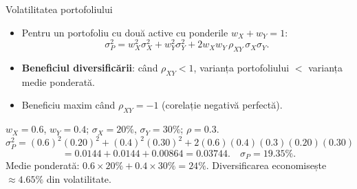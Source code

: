 \documentclass[9pt, aspectratio=169, t]{beamer}
\theoremstyle{definition}
\begin{document}
\begin{frame}{Volatilitatea portofoliului}
\begin{itemize}
    \item Pentru un portofoliu cu două active cu ponderile $w_X + w_Y = 1$:
    \[
    \sigma_P^2 = w_X^2\sigma_X^2 + w_Y^2\sigma_Y^2 + 2w_X w_Y\,\rho_{XY}\,\sigma_X\sigma_Y.
    \]
    \item \textbf{Beneficiul diversificării}: când $\rho_{XY} < 1$, varianța portofoliului $< $ varianța medie ponderată.
    \item Beneficiu maxim când $\rho_{XY} = -1$ (corelație negativă perfectă).
\end{itemize}
\vspace{0.1cm}
\begin{example}
$w_X = 0.6$, $w_Y = 0.4$; $\sigma_X = 20\%$, $\sigma_Y = 30\%$; $\rho = 0.3$.
\[
\sigma_P^2 = (0.6)^2(0.20)^2 + (0.4)^2(0.30)^2 + 2(0.6)(0.4)(0.3)(0.20)(0.30)
\]
\[
= 0.0144 + 0.0144 + 0.00864 = 0.03744. \quad \sigma_P = 19.35\%.
\]
Medie ponderată: $0.6 \times 20\% + 0.4 \times 30\% = 24\%$.
Diversificarea economisește $\approx 4.65\%$ din volatilitate.
\end{example}
\end{frame}
\end{document}
